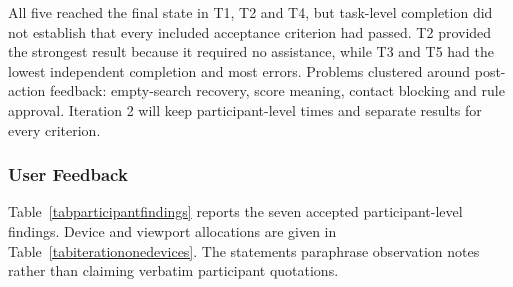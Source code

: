 \documentclass[11pt,a4paper]{article}
\begin{document}
All five reached the final state in T1, T2 and T4, but task-level completion
did not establish that every included acceptance criterion had passed. T2
provided the strongest result because it required no assistance, while T3 and
T5 had the lowest independent completion and most errors. Problems clustered
around post-action feedback: empty-search recovery, score meaning, contact
blocking and rule approval. Iteration 2 will keep participant-level times and
separate results for every criterion.

\subsubsection{User Feedback}

Table~\ref{tabparticipantfindings} reports the seven accepted
participant-level findings. Device and viewport allocations are given in
Table~\ref{tabiterationonedevices}. The statements paraphrase observation
notes rather than claiming verbatim participant quotations.
\end{document}
